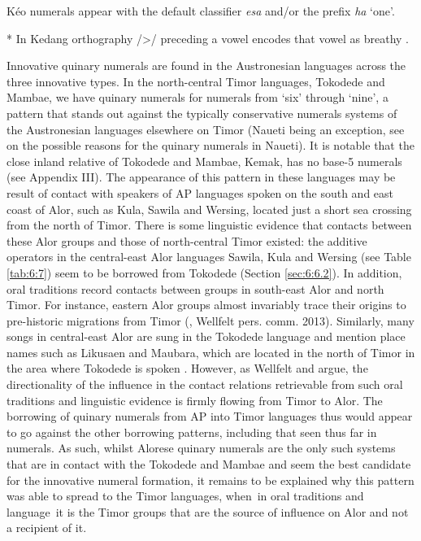 \documentclass[output=paper]{LSP/langsci}
\begin{document}
\begin{table}
\vspace{.5cm}
\normalsize
  {\dag} K\'eo numerals appear with the default classifier \textit{{\textglotstop}esa} and/or the prefix \textit{ha} `one'.

      * In Kedang orthography /{\textgreater}/ preceding a vowel encodes that vowel as breathy \citep{Samely1991}.


\label{tab:6:10}
\end{table}

    Innovative quinary numerals are found in the Austronesian languages across the three innovative types. In the north-central Timor languages, Tokodede and Mambae, we have quinary numerals for numerals from `six' through `nine', a pattern that stands out against the typically conservative numerals systems of the Austronesian languages elsewhere on Timor (Naueti being an exception, see \citet{SchapperEtAl2013} on the possible reasons for the quinary numerals in Naueti). It is notable that the close inland relative of Tokodede and Mambae, Kemak, has no base-5 numerals (see Appendix III). The appearance of this pattern in these languages may be result of contact with speakers of AP languages spoken on the south and east coast of Alor, such as Kula, Sawila and Wersing, located just a short sea crossing from the north of Timor. There is some linguistic evidence that contacts between these Alor groups and those of north-central Timor existed: the additive operators in the central-east Alor languages Sawila, Kula and Wersing (see Table \ref{tab:6:7}) seem to be borrowed from Tokodede (Section \ref{sec:6:6.2}). In addition, oral traditions record contacts between groups in south-east Alor and north Timor. For instance, eastern Alor groups almost invariably trace their origins to pre-historic migrations from Timor (\citet{WellfeltEtAl2013}, Wellfelt pers. comm. 2013). Similarly, many songs in central-east Alor are sung in the Tokodede language and mention place names such as Likusaen and Maubara, which are located in the north of Timor in the area where Tokodede is spoken \citep{WellfeltEtAl2013}. However, as Wellfelt and \citet{Schapper2013} argue, the directionality of the influence in the contact relations retrievable from such oral traditions and linguistic evidence is firmly flowing from Timor to Alor. The borrowing of quinary numerals from AP into Timor languages thus would appear to go against the other borrowing patterns, including that seen thus far in numerals. As such, whilst Alorese quinary numerals are the only such systems that are in contact with the Tokodede and Mambae and seem the best candidate for the innovative numeral formation, it remains to be explained why this pattern was able to spread to the Timor languages, when~in oral traditions and language~it is the Timor groups that are the source of influence on Alor and not a recipient of it.
\end{document}
